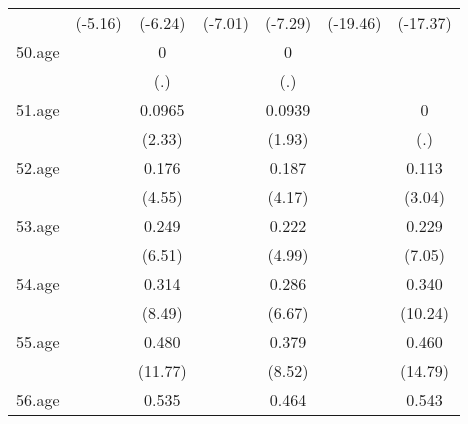 {\begin{tabular}{l*{6}{c}}
            &     (-5.16)         &     (-6.24)         &     (-7.01)         &     (-7.29)         &    (-19.46)         &    (-17.37)         \\
[1em]
50.age      &                     &           0         &                     &           0         &                     &                     \\
            &                     &         (.)         &                     &         (.)         &                     &                     \\
[1em]
51.age      &                     &      0.0965\sym{*}  &                     &      0.0939         &                     &           0         \\
            &                     &      (2.33)         &                     &      (1.93)         &                     &         (.)         \\
[1em]
52.age      &                     &       0.176\sym{***}&                     &       0.187\sym{***}&                     &       0.113\sym{**} \\
            &                     &      (4.55)         &                     &      (4.17)         &                     &      (3.04)         \\
[1em]
53.age      &                     &       0.249\sym{***}&                     &       0.222\sym{***}&                     &       0.229\sym{***}\\
            &                     &      (6.51)         &                     &      (4.99)         &                     &      (7.05)         \\
[1em]
54.age      &                     &       0.314\sym{***}&                     &       0.286\sym{***}&                     &       0.340\sym{***}\\
            &                     &      (8.49)         &                     &      (6.67)         &                     &     (10.24)         \\
[1em]
55.age      &                     &       0.480\sym{***}&                     &       0.379\sym{***}&                     &       0.460\sym{***}\\
            &                     &     (11.77)         &                     &      (8.52)         &                     &     (14.79)         \\
[1em]
56.age      &                     &       0.535\sym{***}&                     &       0.464\sym{***}&                     &       0.543\sym{***}\\

\end{tabular}}
